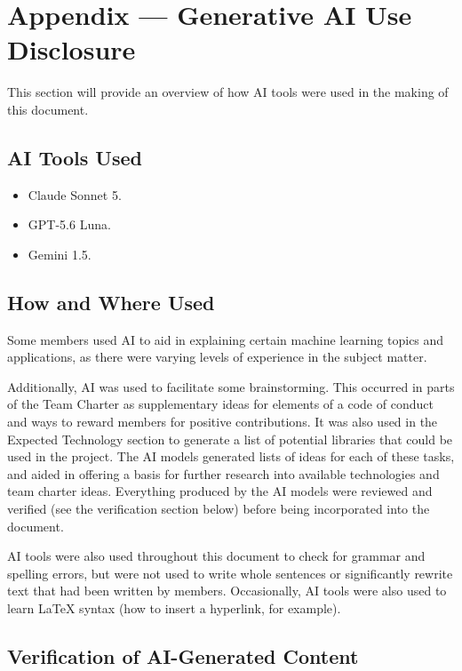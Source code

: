 \documentclass{article}
\begin{document}
\newpage{}

\section{Appendix --- Generative AI Use Disclosure}

This section will provide an overview of how AI tools were used in the making of this document.

\subsection{AI Tools Used}

{\begin{itemize}
    \item Claude Sonnet 5.
    \item GPT-5.6 Luna.
    \item Gemini 1.5.
\end{itemize}}

\subsection{How and Where Used}

Some members used AI to aid in explaining certain machine learning topics and applications, as there were varying levels of experience in the subject matter. 

Additionally, AI was used to facilitate some brainstorming. This occurred in parts of the Team Charter as supplementary ideas for elements of a code of conduct and ways to reward members for positive contributions. It was also used in the Expected Technology section to generate a list of potential libraries that could be used in the project. The AI models generated lists of ideas for each of these tasks, and aided in offering a basis for further research into available technologies and team charter ideas. Everything produced by the AI models were reviewed and verified (see the verification section below) before being incorporated into the document.

AI tools were also used throughout this document to check for grammar and spelling errors, but were not used to write whole sentences or significantly rewrite text that had been written by members. Occasionally, AI tools were also used to learn LaTeX syntax (how to insert a hyperlink, for example).

\subsection{Verification of AI-Generated Content}
\end{document}
